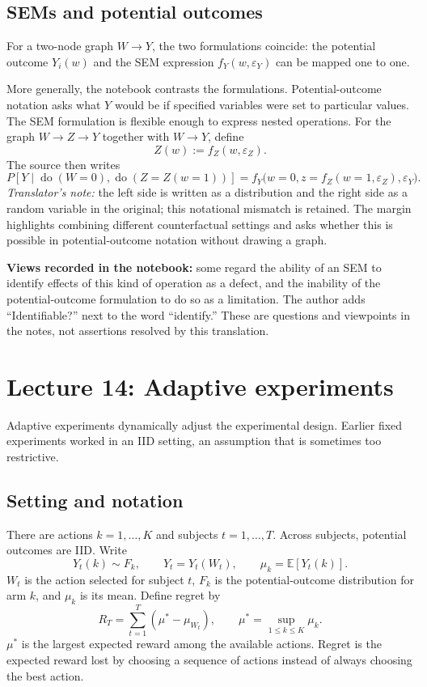 \subsection{SEMs and potential outcomes}
For a two-node graph $W\to Y$, the two formulations coincide: the potential outcome $Y_i(w)$ and the SEM expression $f_Y(w,\varepsilon_Y)$ can be mapped one to one.

More generally, the notebook contrasts the formulations. Potential-outcome notation asks what $Y$ would be if specified variables were set to particular values. The SEM formulation is flexible enough to express nested operations. For the graph $W\to Z\to Y$ together with $W\to Y$, define
\[
 Z(w):=f_Z(w,\varepsilon_Z).
\]
The source then writes
\[
 P[Y\mid\operatorname{do}(W=0),\operatorname{do}(Z=Z(w=1))]
 =f_Y\bigl(w=0,z=f_Z(w=1,\varepsilon_Z),\varepsilon_Y\bigr).
\]
\textit{Translator's note:} the left side is written as a distribution and the right side as a random variable in the original; this notational mismatch is retained. The margin highlights combining different counterfactual settings and asks whether this is possible in potential-outcome notation without drawing a graph.

\textbf{Views recorded in the notebook:} some regard the ability of an SEM to identify effects of this kind of operation as a defect, and the inability of the potential-outcome formulation to do so as a limitation. The author adds ``Identifiable?'' next to the word ``identify.'' These are questions and viewpoints in the notes, not assertions resolved by this translation.

\section{Lecture 14: Adaptive experiments}
Adaptive experiments dynamically adjust the experimental design. Earlier fixed experiments worked in an IID setting, an assumption that is sometimes too restrictive.

\subsection{Setting and notation}
There are actions $k=1,\ldots,K$ and subjects $t=1,\ldots,T$. Across subjects, potential outcomes are IID. Write
\[
 Y_t(k)\sim F_k,\qquad Y_t=Y_t(W_t),\qquad
 \mu_k=\mathbb E[Y_t(k)].
\]
$W_t$ is the action selected for subject $t$, $F_k$ is the potential-outcome distribution for arm $k$, and $\mu_k$ is its mean. Define regret by
\[
 R_T=\sum_{t=1}^T(\mu^*-\mu_{W_t}),\qquad
 \mu^*=\sup_{1\le k\le K}\mu_k.
\]
$\mu^*$ is the largest expected reward among the available actions. Regret is the expected reward lost by choosing a sequence of actions instead of always choosing the best action.


